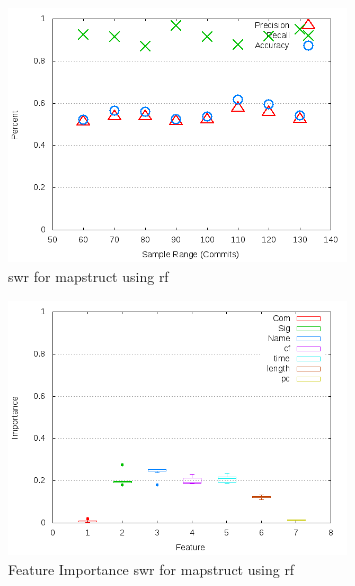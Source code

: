 \begin{figure}[!t]
\centering
\includegraphics[width=0.8\textwidth]{images/rf/test_1/mapstruct_sample_range.png}
\caption{\gls{swr} for mapstruct using \gls{rf}}
\label{fig:test_1_mapstruct_rf}
\end{figure}

\begin{figure}[!t]
\centering
\includegraphics[width=0.8\textwidth]{images/rf/test_1/mapstruct_importance.png}
\caption{Feature Importance \gls{swr} for mapstruct using \gls{rf}}
\label{fig:test_1_mapstruct_rf_importance}
\end{figure}

